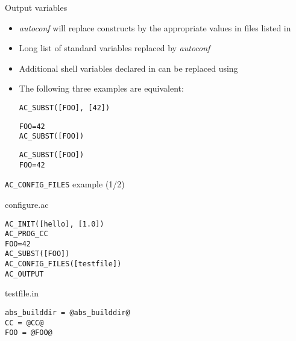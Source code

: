 \begin{frame}[fragile]{Output variables}
  \begin{itemize}
  \item {\em autoconf} will replace  constructs by
    the appropriate values in files listed in 
  \item Long list of standard variables replaced by {\em autoconf}
  \item Additional shell variables declared in  can
    be replaced using 
  \item The following three examples are equivalent:
    \begin{block}{}
\begin{verbatim}
AC_SUBST([FOO], [42])
\end{verbatim}
    \end{block}

    \begin{block}{}
\begin{verbatim}
FOO=42
AC_SUBST([FOO])
\end{verbatim}
    \end{block}

    \begin{block}{}
\begin{verbatim}
AC_SUBST([FOO])
FOO=42
\end{verbatim}
    \end{block}

  \end{itemize}
\end{frame}

\begin{frame}[fragile]{{\tt AC\_CONFIG\_FILES} example (1/2)}

\begin{block}{configure.ac}
\begin{verbatim}
AC_INIT([hello], [1.0])
AC_PROG_CC
FOO=42
AC_SUBST([FOO])
AC_CONFIG_FILES([testfile])
AC_OUTPUT
\end{verbatim}
\end{block}

\begin{block}{testfile.in}
\begin{verbatim}
abs_builddir = @abs_builddir@
CC = @CC@
FOO = @FOO@
\end{verbatim}
\end{block}

\end{frame}

